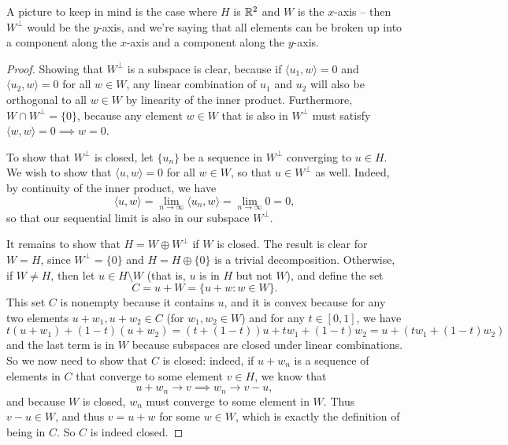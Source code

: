 A picture to keep in mind is the case where $H$ is $\mathbb R^2$ and $W$ is the $x$-axis -- then $W^\perp$ would be the $y$-axis, and we're saying that all elements can be broken up into a component along the $x$-axis and a component along the $y$-axis.

\begin{proof}
Showing that $W^\perp$ is a subspace is clear, because if $\langle u_1, w \rangle = 0$ and $\langle u_2,  w\rangle = 0$ for all $w \in W$, any linear combination of $u_1$ and $u_2$ will also be orthogonal to all $w \in W$ by linearity of the inner product. Furthermore, $W \cap W^\perp = \{0\}$, because any element $w \in W$ that is also in $W^\perp$ must satisfy $\langle w, w \rangle = 0 \implies w = 0$. 

To show that $W^\perp$ is closed, let $\{u_n\}$ be a sequence in $W^\perp$ converging to $u \in H$. We wish to show that $\langle u, w \rangle = 0$ for all $w \in W$, so that $u \in W^\perp$ as well. Indeed, by continuity of the inner product, we have
\[
    \langle u, w \rangle = \lim_{n \to \infty} \langle u_n, w \rangle = \lim_{n \to \infty} 0 = 0,
\]
so that our sequential limit is also in our subspace $W^\perp$. 

It remains to show that $H = W \oplus W^\perp$ if $W$ is closed. The result is clear for $W = H$, since $W^\perp = \{0\}$ and $H = H \oplus \{0\}$ is a trivial decomposition. Otherwise, if $W \ne H$, then let $u \in H \setminus W$ (that is, $u$ is in $H$ but not $W$), and define the set 
\[
    C = u + W = \{u + w: w \in W\}.
\]
This set $C$ is nonempty because it contains $u$, and it is convex because for any two elements $u + w_1, u + w_2 \in C$ (for $w_1, w_2 \in W$) and for any $t \in [0, 1]$, we have
\[
    t(u + w_1) + (1-t) (u + w_2) = (t + (1-t)) u + tw_1 + (1-t) w_2 = u + \left(tw_1 + (1-t) w_2\right)
\]
and the last term is in $W$ because subspaces are closed under linear combinations. So we now need to show that $C$ is closed: indeed, if $u + w_n$ is a sequence of elements in $C$ that converge to some element $v \in H$, we know that 
\[
    u + w_n \to v \implies w_n \to v- u,
\]
and because $W$ is closed, $w_n$ must converge to some element in $W$. Thus $v - u \in W$, and thus $v = u + w$ for some $w \in W$, which is exactly the definition of being in $C$. So $C$ is indeed closed.


\end{proof}
